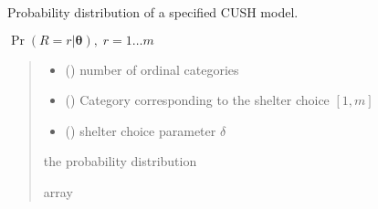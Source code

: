 \documentclass[letterpaper,10pt,english]{sphinxmanual}
\begin{document}

\begin{fulllineitems}
\label{\detokenize{cubmods:cubmods.cush.pmf}}
\pysigstartsignatures
{}
\pysigstopsignatures
\sphinxAtStartPar
Probability distribution of a specified CUSH model.

\sphinxAtStartPar
\(\Pr(R = r | \pmb\theta),\; r=1 \ldots m\)
\begin{quote}\begin{description}
\begin{itemize}
\item {} 
\sphinxAtStartPar
{} () \textendash{} number of ordinal categories

\item {} 
\sphinxAtStartPar
{} () \textendash{} Category corresponding to the shelter choice \([1,m]\)

\item {} 
\sphinxAtStartPar
{} () \textendash{} shelter choice parameter \(\delta\)

\end{itemize}

\sphinxAtStartPar
the probability distribution

\sphinxAtStartPar
array

\end{description}\end{quote}

\end{fulllineitems}

\end{document}
